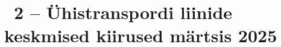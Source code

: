 
\clearpage %
\label{chapter:appendix-something} %
\chapter*{\appendixTitle~2 -- Ühistranspordi liinide keskmised kiirused märtsis 2025} %

%
